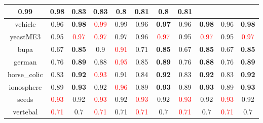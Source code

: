 \documentclass{article}%
\begin{document}
\begin{tabular}{c|cccccccccc}
{0.99
}&0.98&0.83&0.83&0.8&\textbf{0.81}&0.8&\textbf{0.81}\\%
\hline%
vehicle&0.96&\textbf{0.98}&\textcolor{red}{ 
0.99
}&0.99&0.96&\textbf{0.97}&0.96&\textbf{0.98}&0.96&\textbf{0.98}\\%
\hline%
yeastME3&0.95&\textcolor{red}{ 
0.97
}&\textcolor{red}{ 
0.97
}&0.97&0.96&\textcolor{red}{ 
0.97
}&0.95&\textcolor{red}{ 
0.97
}&0.95&\textcolor{red}{ 
0.97
}\\%
\hline%
bupa&0.67&\textbf{0.85}&0.9&\textcolor{red}{ 
0.91
}&0.71&\textbf{0.85}&0.67&\textbf{0.85}&0.67&\textbf{0.85}\\%
\hline%
german&0.76&\textbf{0.89}&0.88&\textcolor{red}{ 
0.95
}&0.85&\textbf{0.89}&0.76&\textbf{0.88}&0.76&\textbf{0.89}\\%
\hline%
horse\_colic&0.83&\textbf{0.92}&\textcolor{red}{ 
0.93
}&0.91&0.84&\textbf{0.92}&0.83&\textbf{0.92}&0.83&\textbf{0.92}\\%
\hline%
ionosphere&0.89&\textbf{0.93}&0.92&\textcolor{red}{ 
0.96
}&0.89&\textbf{0.93}&0.89&\textbf{0.93}&0.89&\textbf{0.93}\\%
\hline%
seeds&\textcolor{red}{ 
0.93
}&0.92&\textcolor{red}{ 
0.93
}&0.92&\textcolor{red}{ 
0.93
}&0.92&\textcolor{red}{ 
0.93
}&0.92&\textcolor{red}{ 
0.93
}&0.92\\%
\hline%
vertebal&\textcolor{red}{ 
0.71
}&0.7&\textcolor{red}{ 
0.71
}&0.71&\textcolor{red}{ 
0.71
}&0.7&\textcolor{red}{ 
0.71
}&0.7&\textcolor{red}{ 
0.71
}&0.7\\%
\hline%
\end{tabular}

%
\end{document}
